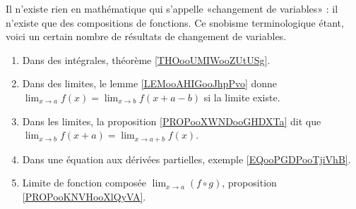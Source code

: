 	\label{THEMEooChangementVariables}
Il n'existe rien en mathématique qui s'appelle «changement de variables» : il n'existe que des compositions de fonctions. Ce snobisme terminologique étant, voici un certain nombre de résultats de changement de variables.
\begin{enumerate}
	\item
	      Dans des intégrales, théorème \ref{THOooUMIWooZUtUSg}.
	\item
	      Dans des limites, le lemme \ref{LEMooAHIGooJhpPvo} donne \( \lim_{x\to a} f(x)=\lim_{x\to b}f(x+a-b)\) si la limite existe.
	\item
	      Dans les limites, la proposition \ref{PROPooXWNDooGHDXTa} dit que \( \lim_{x\to b}f(x+a)=\lim_{x\to a+b}f(x)\).
	\item
	      Dans une équation aux dérivées partielles, exemple \ref{EQooPGDPooTjiVhB}.
	\item
	      Limite de fonction composée \( \lim_{x\to a}(f\circ g) \), proposition \ref{PROPooKNVHooXlQyVA}.
\end{enumerate}
